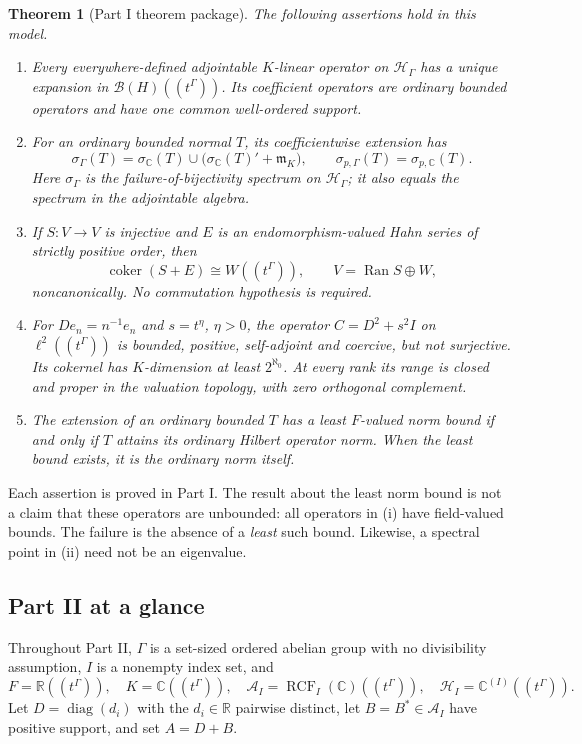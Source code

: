 \documentclass[11pt,a4paper]{article}
\numberwithin{equation}{section}
\newtheorem{theorem}{Theorem}[section]
\theoremstyle{definition}
\theoremstyle{remark}
\newcommand{\C}{\mathbb C}
\newcommand{\R}{\mathbb R}
\newcommand{\K}{K}
\newcommand{\Fld}{F}
\newcommand{\mK}{\mathfrak m_K}
\newcommand{\Hil}{\mathcal H_\Gamma}
\newcommand{\Hrf}{\mathcal H_I}
\newcommand{\B}{\mathcal B(H)}
\newcommand{\Arf}{\mathcal A_I}
\newcommand{\Ran}{\operatorname{Ran}}
\newcommand{\coker}{\operatorname{coker}}
\newcommand{\diag}{\operatorname{diag}}
\newcommand{\RCF}{\operatorname{RCF}}
\begin{document}
\begin{theorem}[Part I theorem package]\label{ihs:hh:thm:package}
The following assertions hold in this model.
\begin{enumerate}[label=\textup{(\roman*)}]
\item Every everywhere-defined adjointable $\K$-linear operator on $\Hil$
has a unique expansion in $\B((t^\Gamma))$. Its coefficient operators are
ordinary bounded operators and have one common well-ordered support.
\item For an ordinary bounded normal $T$, its coefficientwise extension has
\begin{equation}\label{ihs:hh:eq:main-spectrum}
 \sigma_\Gamma(T)=\sigma_\C(T)\cup
       \bigl(\sigma_\C(T)'+\mK\bigr),
 \qquad \sigma_{p,\Gamma}(T)=\sigma_{p,\C}(T).
\end{equation}
Here $\sigma_\Gamma$ is the failure-of-bijectivity spectrum on $\Hil$; it
also equals the spectrum in the adjointable algebra.
\item If $S:V\to V$ is injective and $E$ is an endomorphism-valued Hahn
series of strictly positive order, then
\[
 \coker(S+E)\cong W((t^\Gamma)),\qquad
 V=\Ran S\oplus W,
\]
noncanonically. No commutation hypothesis is required.
\item For $D e_n=n^{-1}e_n$ and $s=t^\eta$, $\eta>0$, the operator
$C=D^2+s^2I$ on $\ell^2((t^\Gamma))$ is bounded, positive, self-adjoint and
coercive, but not surjective. Its cokernel has $\K$-dimension at least
$2^{\aleph_0}$. At every rank its range is closed and proper in the
valuation topology, with zero orthogonal complement.
\item The extension of an ordinary bounded $T$ has a least
$\Fld$-valued norm bound if and only if $T$ attains its ordinary Hilbert
operator norm. When the least bound exists, it is the ordinary norm itself.
\end{enumerate}
\end{theorem}

Each assertion is proved in Part I. The result about the least norm bound is
not a claim that these operators are unbounded: all operators in (i) have
field-valued bounds. The failure is the absence of a \emph{least} such
bound. Likewise, a spectral point in (ii) need not be an eigenvalue.

\subsection{Part II at a glance}\label{ihs:sec:glancetwo}
Throughout Part II, $\Gamma$ is a set-sized ordered abelian group with no
divisibility assumption, $I$ is a nonempty index set, and
\[
 \Fld=\R((t^\Gamma)),\quad \K=\C((t^\Gamma)),\quad
 \Arf=\RCF_I(\C)((t^\Gamma)),\quad \Hrf=\C^{(I)}((t^\Gamma)).
\]
Let $D=\diag(d_i)$ with the $d_i\in\R$ pairwise distinct, let
$B=B^*\in\Arf$ have positive support, and set $A=D+B$.
\end{document}
